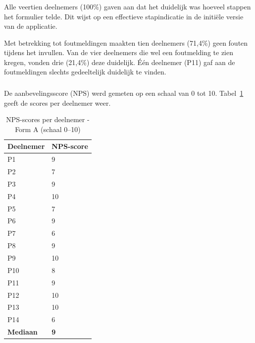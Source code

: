 \subsubsection{}

Alle veertien deelnemers (100\%) gaven aan dat het duidelijk was hoeveel stappen het formulier telde. Dit wijst op een effectieve stapindicatie in de initiële versie van de applicatie.

Met betrekking tot foutmeldingen maakten tien deelnemers (71,4\%) geen fouten tijdens het invullen. Van de vier deelnemers die wel een foutmelding te zien kregen, vonden drie (21,4\%) deze duidelijk. Één deelnemer (P11) gaf aan de foutmeldingen slechts gedeeltelijk duidelijk te vinden.

\subsubsection{}

De aanbevelingsscore (NPS) werd gemeten op een schaal van 0 tot 10. Tabel~\ref{tab:vroeg-nps} geeft de scores per deelnemer weer.

\begin{table}[h]
  \centering
  \caption[NPS-scores vroege test Form A]{NPS-scores per deelnemer - Form A (schaal 0–10)}
  \label{tab:vroeg-nps}
  \begin{tabular}{ll}
    \hline
    \textbf{Deelnemer} & \textbf{NPS-score} \\
    \hline
    P1  & 9  \\
    P2  & 7  \\
    P3  & 9  \\
    P4  & 10 \\
    P5  & 7  \\
    P6  & 9  \\
    P7  & 6  \\
    P8  & 9  \\
    P9  & 10 \\
    P10 & 8  \\
    P11 & 9  \\
    P12 & 10 \\
    P13 & 10 \\
    P14 & 6  \\
    \hline
    \textbf{Mediaan} & \textbf{9} \\
    \hline
  \end{tabular}
\end{table}

